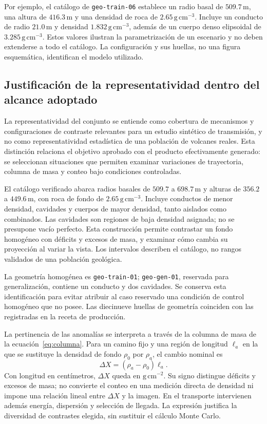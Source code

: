 \documentclass[11pt,a4paper]{article}
\begin{document}
Por ejemplo, el catálogo de \texttt{geo-train-06} establece un radio basal de $509.7\,\mathrm m$, una altura de $416.3\,\mathrm m$ y una densidad de roca de $2.65\,\mathrm{g\,cm^{-3}}$. Incluye un conducto de radio $21.0\,\mathrm m$ y densidad $1.832\,\mathrm{g\,cm^{-3}}$, además de un cuerpo denso elipsoidal de $3.285\,\mathrm{g\,cm^{-3}}$. Estos valores ilustran la parametrización de un escenario y no deben extenderse a todo el catálogo. La configuración y sus huellas, no una figura esquemática, identifican el modelo utilizado.

\subsection{Justificación de la representatividad dentro del alcance adoptado}

La representatividad del conjunto se entiende como cobertura de mecanismos y configuraciones de contraste relevantes para un estudio sintético de transmisión, y no como representatividad estadística de una población de volcanes reales. Esta distinción relaciona el objetivo aprobado con el producto efectivamente generado: se seleccionan situaciones que permiten examinar variaciones de trayectoria, columna de masa y conteo bajo condiciones controladas.

El catálogo verificado abarca radios basales de $509.7$ a $698.7\,\mathrm m$ y alturas de $356.2$ a $449.6\,\mathrm m$, con roca de fondo de $2.65\,\mathrm{g\,cm^{-3}}$. Incluye conductos de menor densidad, cavidades y cuerpos de mayor densidad, tanto aislados como combinados. Las cavidades son regiones de baja densidad asignada; no se presupone vacío perfecto. Esta construcción permite contrastar un fondo homogéneo con déficits y excesos de masa, y examinar cómo cambia su proyección al variar la vista. Los intervalos describen el catálogo, no rangos validados de una población geológica.

La geometría homogénea es \texttt{geo-train-01}; \texttt{geo-gen-01}, reservada para generalización, contiene un conducto y dos cavidades. Se conserva esta identificación para evitar atribuir al caso reservado una condición de control homogéneo que no posee. Las diecinueve huellas de geometría coinciden con las registradas en la receta de producción.

La pertinencia de las anomalías se interpreta a través de la columna de masa de la ecuación~\eqref{eq:columna}. Para un camino fijo y una región de longitud $\ell_a$ en la que se sustituye la densidad de fondo $\rho_0$ por $\rho_a$, el cambio nominal es
\begin{equation}
 \Delta X=(\rho_a-\rho_0)\ell_a.
\end{equation}
Con longitud en centímetros, $\Delta X$ queda en $\mathrm{g\,cm^{-2}}$. Su signo distingue déficits y excesos de masa; no convierte el conteo en una medición directa de densidad ni impone una relación lineal entre $\Delta X$ y la imagen. En el transporte intervienen además energía, dispersión y selección de llegada. La expresión justifica la diversidad de contrastes elegida, sin sustituir el cálculo Monte Carlo.
\end{document}
